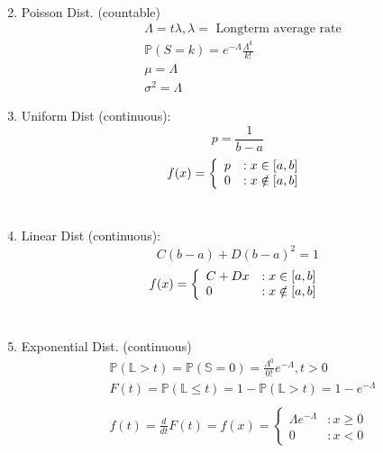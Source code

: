 \documentclass[12pt]{article}
\renewcommand{\=}[1]{\stackrel{#1}{=}} %
\theoremstyle{definition}
\theoremstyle{remark}
\begin{document}
\begin{enumerate}
\begin{align*}
  \end{align*}
\item Poisson Dist. (countable)
  \begin{align*}
    &\Lambda = t\lambda, \lambda = \textrm{ Longterm average rate} \\
    &\mathbb{P}(S=k) = e^{-\Lambda}\frac{\Lambda^k}{k!} \\
    &\mu = \Lambda \\
    &\sigma^2 = \Lambda
  \end{align*}
\item Uniform Dist (continuous):\\
  \begin{equation}
    p = \frac{1}{b-a}
  \end{equation}
  \begin{displaymath}
    f(x) = \left\{
      \begin{array}{lr}
        p & : x \in [a,b]\\
        0 & : x \notin [a,b]
      \end{array}
    \right.\\
  \end{displaymath}\\
\item Linear Dist (continuous):
  \begin{equation}
    C(b-a)+D(b-a)^2=1
  \end{equation}
  \begin{displaymath}
    f(x) = \left\{
      \begin{array}{lr}
        C+Dx & : x \in [a,b]\\
        0 & : x \notin [a,b]
      \end{array}
    \right.\\
  \end{displaymath}\\
\item Exponential Dist. (continuous)
  \begin{align*}
    &\mathbb{P}(\mathbb{L} > t) = \mathbb{P}(\mathbb{S} = 0) = \frac{\Lambda^0}{0!}e^{-\Lambda}, t>0\\
    &F(t) = \mathbb{P}(\mathbb{L} \leq t) = 1 -\mathbb{P}(\mathbb{L} > t) = 1-e^{-\Lambda}\\ \\
    &f(t) = \frac{d}{dt}F(t) = 
    f(x) = \left\{
      \begin{array}{lr}
        \Lambda e^{-\Lambda} & : x \geq 0\\
        0 & : x < 0
      \end{array}

\end{align*}
\end{enumerate}
\end{document}
